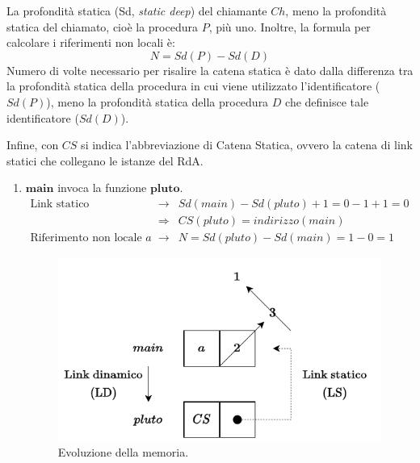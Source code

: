 \documentclass[a4paper]{article}
\begin{document}
	La profondità statica (Sd, \emph{static deep}) del chiamante $Ch$, meno la profondità statica del chiamato, cioè la procedura $P$, più uno. Inoltre, la formula per calcolare i riferimenti non locali è:
	\begin{equation*}
		N = Sd(P) - Sd(D)
	\end{equation*}
	Numero di volte necessario per risalire la catena statica è dato dalla differenza tra la profondità statica della procedura in cui viene utilizzato l'identificatore ($Sd(P)$), meno la profondità statica della procedura $D$ che definisce tale identificatore ($Sd(D)$).
	
	Infine, con $CS$ si indica l'abbreviazione di Catena Statica, ovvero la catena di link statici che collegano le istanze del RdA.\newpage
	\begin{enumerate}
		\item $\mathbf{main}$ invoca la funzione $\mathbf{pluto}$.
		\begin{equation*}
			\begin{array}{rcl}
				\text{Link statico} &\rightarrow& Sd(main) - Sd(pluto) + 1 = 0 - 1 + 1 = 0 \\ [.3em]
				&\Rightarrow& CS\left(pluto\right) = indirizzo\left(main\right) \\ [.3em]
				\text{Riferimento non locale }a &\rightarrow& N = Sd(pluto) - Sd(main) = 1 - 0 = 1
			\end{array}
		\end{equation*}
		\begin{figure}[!htp]
			\centering
			\includegraphics[width=.6\textwidth]{img/ex3-2.pdf}
			\caption*{Evoluzione della memoria.}
		\end{figure}\newpage
		

\end{enumerate}
\end{document}
